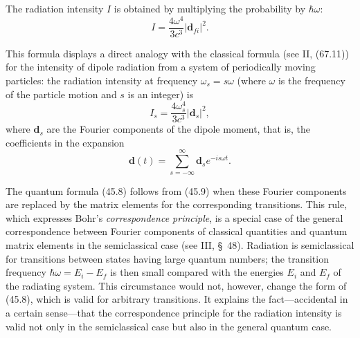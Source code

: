 The radiation intensity $I$ is obtained by multiplying the probability by $\hbar\omega$:
\begin{equation}
I=\frac{4\omega^4}{3c^3}|\mathbf d_{fi}|^2.
\tag{45.8}
\end{equation}

This formula displays a direct analogy with the classical formula (see II, (67.11)) for the intensity of dipole radiation from a system of periodically moving particles: the radiation intensity at frequency $\omega_s=s\omega$ (where $\omega$ is the frequency of the particle motion and $s$ is an integer) is
\begin{equation}
I_s=\frac{4\omega_s^4}{3c^3}|\mathbf d_s|^2,
\tag{45.9}
\end{equation}
where $\mathbf d_s$ are the Fourier components of the dipole moment, that is, the coefficients in the expansion
\begin{equation}
\mathbf d(t)=\sum_{s=-\infty}^{\infty}\mathbf d_s e^{-is\omega t}.
\tag{45.10}
\end{equation}

The quantum formula (45.8) follows from (45.9) when these Fourier components are replaced by the matrix elements for the corresponding transitions. This rule, which expresses Bohr's \emph{correspondence principle}, is a special case of the general correspondence between Fourier components of classical quantities and quantum matrix elements in the semiclassical case (see III, \S~48). Radiation is semiclassical for transitions between states having large quantum numbers; the transition frequency $\hbar\omega=E_i-E_f$ is then small compared with the energies $E_i$ and $E_f$ of the radiating system. This circumstance would not, however, change the form of (45.8), which is valid for arbitrary transitions. It explains the fact---accidental in a certain sense---that the correspondence principle for the radiation intensity is valid not only in the semiclassical case but also in the general quantum case.
